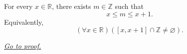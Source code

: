 \begin{lemma}
\label{lem:unit-length-interval-contains-integer}
For every $x\in\mathbb{R}$, there exists $m\in\mathbb{Z}$ such that
\[
  x\leq m\leq x+1.
\]
Equivalently,
\[
  (\forall x\in\mathbb{R})([x,x+1]\cap\mathbb{Z}\neq\varnothing).
\]

\smallskip
\noindent
\hyperref[prf:unit-length-interval-contains-integer]{\textit{Go to proof.}}
\end{lemma}